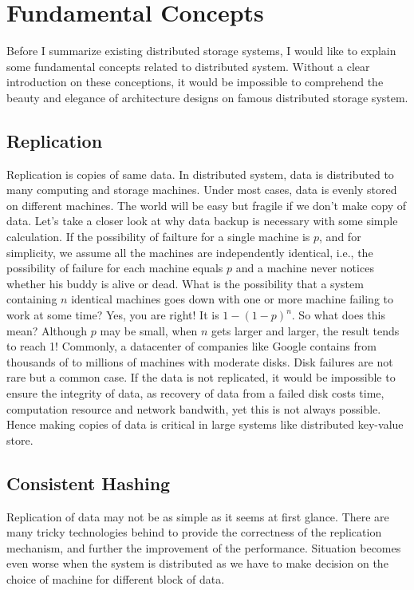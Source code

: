 \documentclass{article}
\begin{document}
\section{Fundamental Concepts}
Before I summarize existing distributed storage systems, I would like to
explain some fundamental concepts related to distributed system. Without a
clear introduction on these conceptions, it would be impossible to comprehend
the beauty and elegance of architecture designs on famous distributed storage
system.

\subsection{Replication}
Replication is copies of same data. In distributed system, data is distributed
to many computing and storage machines. Under most cases, data is evenly
stored on different machines. The world will be easy but fragile if we don't
make copy of data. Let's take a closer look at why data backup is necessary
with some simple calculation. If the possibility of failture for a single
machine is $p$, and for simplicity, we assume all the machines are
independently identical, i.e., the possibility of failure for each machine
equals $p$ and a machine never notices whether his buddy is alive or dead.
What is the possibility that a system containing $n$ identical machines goes
down with one or more machine failing to work at some time? Yes, you are
right! It is $1 - (1 - p)^n$. So what does this mean? Although $p$ may be
small, when $n$ gets larger and larger, the result tends to reach 1! Commonly,
a datacenter of companies like Google contains from thousands of to millions
of machines with moderate disks. Disk failures are not rare but a common case.
If the data is not replicated, it would be impossible to ensure the integrity
of data, as recovery of data from a failed disk costs time, computation
resource and network bandwith, yet this is not always possible. Hence making
copies of data is critical in large systems like distributed key-value store.\\

\subsection{Consistent Hashing}
Replication of data may not be as simple as it seems at first glance. There
are many tricky technologies behind to provide the correctness of the
replication mechanism, and further the improvement of the performance.
Situation becomes even worse when the system is distributed as we have to make
decision on the choice of machine for different block of data.\\
\end{document}
